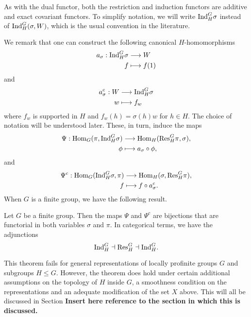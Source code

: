 As with the dual functor, both the restriction and induction functors are additive and exact covariant functors. To simplify notation, we will write $\mathrm{Ind}_H^G\sigma$ instead of $\mathrm{Ind}_H^G(\sigma,W)$, which is the usual convention in the literature.

We remark that one can construct the following canonical $H$-homomorphisms 
\begin{align*}
    a_\sigma: \mathrm{Ind}_H^G\sigma&\longrightarrow W\\
    f&\longmapsto f(1)
\end{align*}
and 
\begin{align*}
    a_\sigma^c: W&\longrightarrow \mathrm{Ind}_H^G\sigma\\
    w&\longmapsto f_w
\end{align*}
where $f_w$ is supported in $H$ and $f_w(h)=\sigma(h)w$ for $h\in H$. The choice of notation will be understood later. These, in turn, induce the maps 
\begin{align*}
    \Psi:\mathrm{Hom}_G(\pi,\mathrm{Ind}_H^G\sigma)&\longrightarrow\mathrm{Hom}_H(\mathrm{Res}_H^G\pi,\sigma),\\
    \phi&\longmapsto a_\sigma\circ\phi,
\end{align*}
and
\begin{align*}
    \Psi^c:\mathrm{Hom}_G(\mathrm{Ind}_H^G\sigma,\pi)&\longrightarrow\mathrm{Hom}_H(\sigma,\mathrm{Res}_H^G\pi),\\
    f&\longmapsto f\circ a_\sigma^c.
\end{align*}
When $G$ is a finite group, we have the following result.
\begin{thm}
    Let $G$ be a finite group. Then the maps $\Psi$ and $\Psi^c$ are bijections that are functorial in both variables $\sigma$ and $\pi$. In categorical terms, we have the adjunctions $$\mathrm{Ind}_H^G\dashv\mathrm{Res}_H^G\dashv\mathrm{Ind}_H^G.$$
\end{thm}

This theorem fails for general representations of locally profinite groups $G$ and subgroups $H\leq G$. However, the theorem does hold under certain additional assumptions on the topology of $H$ inside $G$, a smoothness condition on the representations and an adequate modification of the set $X$ above. This will all be discussed in Section \textbf{Insert here reference to the section in which this is discussed.}